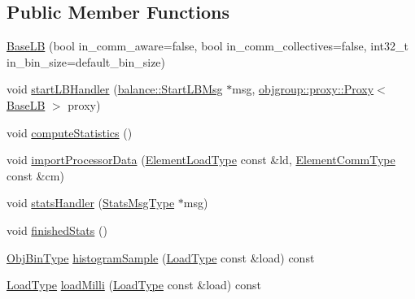 \subsection*{Public Member Functions}
\begin{DoxyCompactItemize}
\item 
\hyperlink{structvt_1_1vrt_1_1collection_1_1lb_1_1_base_l_b_addef25b03975034a0936c515a2942d43}{Base\+LB} (bool in\+\_\+comm\+\_\+aware=false, bool in\+\_\+comm\+\_\+collectives=false, int32\+\_\+t in\+\_\+bin\+\_\+size=default\+\_\+bin\+\_\+size)
\item 
void \hyperlink{structvt_1_1vrt_1_1collection_1_1lb_1_1_base_l_b_a26d684f9f07e7635886b12d0235e081e}{start\+L\+B\+Handler} (\hyperlink{structvt_1_1vrt_1_1collection_1_1balance_1_1_start_l_b_msg}{balance\+::\+Start\+L\+B\+Msg} $\ast$msg, \hyperlink{structvt_1_1objgroup_1_1proxy_1_1_proxy}{objgroup\+::proxy\+::\+Proxy}$<$ \hyperlink{structvt_1_1vrt_1_1collection_1_1lb_1_1_base_l_b}{Base\+LB} $>$ proxy)
\item 
void \hyperlink{structvt_1_1vrt_1_1collection_1_1lb_1_1_base_l_b_a44ab2755595d800e50576fa53bee7d91}{compute\+Statistics} ()
\item 
void \hyperlink{structvt_1_1vrt_1_1collection_1_1lb_1_1_base_l_b_a0a3c06181a20994a9263e680f3385bd1}{import\+Processor\+Data} (\hyperlink{structvt_1_1vrt_1_1collection_1_1lb_1_1_base_l_b_aa286d31a0820a8fc9218ccb858368fca}{Element\+Load\+Type} const \&ld, \hyperlink{structvt_1_1vrt_1_1collection_1_1lb_1_1_base_l_b_ac3f8560bfe41aa593eb7d5bd1241cc4c}{Element\+Comm\+Type} const \&cm)
\item 
void \hyperlink{structvt_1_1vrt_1_1collection_1_1lb_1_1_base_l_b_a0caca58b47838888ed2b4c3987bd9745}{stats\+Handler} (\hyperlink{structvt_1_1vrt_1_1collection_1_1lb_1_1_base_l_b_acebfe78fa7dbafe6e9e5e5e514cda278}{Stats\+Msg\+Type} $\ast$msg)
\item 
void \hyperlink{structvt_1_1vrt_1_1collection_1_1lb_1_1_base_l_b_a4bfffbc4de6887a89f5ec5561a7bccdd}{finished\+Stats} ()
\item 
\hyperlink{structvt_1_1vrt_1_1collection_1_1lb_1_1_base_l_b_ae0bff8fcf0dec0abc1d81836cf1d060a}{Obj\+Bin\+Type} \hyperlink{structvt_1_1vrt_1_1collection_1_1lb_1_1_base_l_b_a73ede03ca02dc385fcde2bd067978a4a}{histogram\+Sample} (\hyperlink{structvt_1_1vrt_1_1collection_1_1lb_1_1_base_l_b_a215e22b9f12678303f49615ae3be05cc}{Load\+Type} const \&load) const
\item 
\hyperlink{structvt_1_1vrt_1_1collection_1_1lb_1_1_base_l_b_a215e22b9f12678303f49615ae3be05cc}{Load\+Type} \hyperlink{structvt_1_1vrt_1_1collection_1_1lb_1_1_base_l_b_a9293a46022910a7b0b93938dfb886477}{load\+Milli} (\hyperlink{structvt_1_1vrt_1_1collection_1_1lb_1_1_base_l_b_a215e22b9f12678303f49615ae3be05cc}{Load\+Type} const \&load) const

\end{DoxyCompactItemize}
